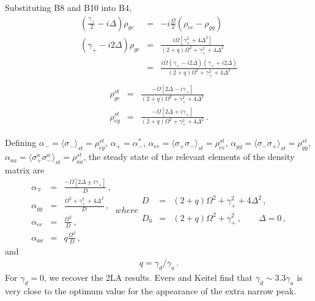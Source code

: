 \documentclass[twocolumn,aps,eqsecnum,showkeys,amsmath]{revtex4-2}
\begin{document}
Substituting B8 and B10 into B4, 
%
\begin{eqnarray*}
\left( \frac{\gamma_+}{2} -i\Delta \right) \rho_{ge}  
&=& -i\frac{\Omega}{2} (\rho_{ee} -\rho_{gg})   \\ 
(\gamma_+  -i2\Delta) \rho_{ge} 
 &=& \frac{ i \Omega [\gamma_+^2 +4\Delta^2] }
    { (2+q) \Omega^2 +\gamma_+^2 +4\Delta^2 }    \\ 
&=& \frac{ i \Omega (\gamma_+  -i2\Delta) (\gamma_+  +i2\Delta)}
    { (2+q) \Omega^2 +\gamma_+^2 +4\Delta^2 }    \\ 
\end{eqnarray*}
%
\begin{eqnarray}
\rho_{ge}^{st} &=& \frac{ -\Omega [2\Delta -i \gamma_+] }
  	 { (2+q) \Omega^2 +\gamma_+^2 +4\Delta^2 }    \\ 
\rho_{eg}^{st} &=& \frac{ -\Omega [2\Delta +i \gamma_+] }
  	{ (2+q) \Omega^2 +\gamma_+^2 +4\Delta^2 } 	\,.
\end{eqnarray}

Defining 
$\alpha_- =\langle \sigma_- \rangle_{st} =\rho_{eg}^{st} $, 
$\alpha_+ =\alpha_-^{\ast}$, 
$\alpha_{ee} =\langle \sigma_+ \sigma_- \rangle_{st} =\rho_{ee}^{st}$, 
$\alpha_{gg} =\langle \sigma_- \sigma_+ \rangle_{st} =\rho_{gg}^{st} $, 
$\alpha_{aa} =\langle \sigma_+^a \sigma_-^a \rangle_{st} =\rho_{aa}^{st}$, 
the steady state of the relevant elements of the density matrix are  
%
\begin{subequations}
\begin{eqnarray}
\alpha_{\mp} &=& \frac{-\Omega[2\Delta \pm i \gamma_+]}{D} \,,  \\ 
\alpha_{gg} &=& \frac{\Omega^2 +\gamma_+^2 +4\Delta^2}{D} 
	\,, \\ 
\alpha_{ee} &=& \frac{\Omega^2}{D} \,, 	\\ 
\alpha_{aa} &=& q\frac{ \Omega^2}{D} \,, 	 
\end{eqnarray}
where 
%
\begin{eqnarray}
D &=& (2 +q)\Omega^2 +\gamma_+^2 +4\Delta^2 	\,,  \\
D_0 &=& (2+q)\Omega^2 +\gamma_+^2 \,, 	\qquad 	\Delta=0 \,, 
	\nonumber
\end{eqnarray}
\end{subequations}
and
%
\begin{eqnarray}
q = \gamma_d/\gamma_a 	\,.
\end{eqnarray}
For $\gamma_d=0$, we recover the 2LA results. Evers and Keitel 
\cite{EvKe02} find that $\gamma_d \sim 3.3 \gamma_a$ is very close 
to the optimum value for the appearance of the extra narrow peak. 
\end{document}
